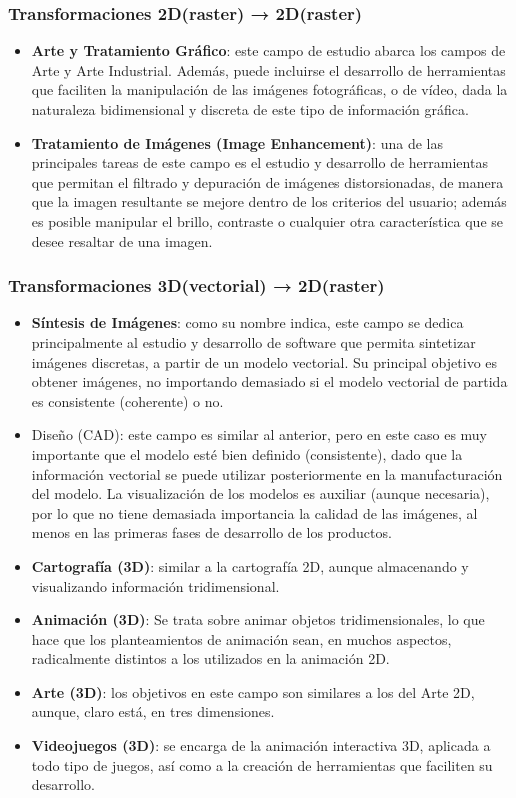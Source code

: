 \subsubsection{Transformaciones 2D(raster) → 2D(raster)}
\begin{itemize}
    \item \textbf{Arte y Tratamiento Gráfico}: este campo de estudio abarca los campos de Arte y Arte Industrial. Además, puede incluirse el desarrollo de herramientas que faciliten la manipulación de las imágenes fotográficas, o de vídeo, dada la naturaleza bidimensional y discreta de este tipo de información gráfica.
    \item \textbf{Tratamiento de Imágenes (Image Enhancement)}: una de las principales tareas de este campo es el estudio y desarrollo de herramientas que permitan el filtrado y depuración de imágenes distorsionadas, de manera que la imagen resultante se mejore dentro de los criterios del usuario; además es posible manipular el brillo, contraste o cualquier otra característica que se desee resaltar de una imagen.
\end{itemize}


\subsubsection{Transformaciones 3D(vectorial) → 2D(raster)}
\begin{itemize}
    \item \textbf{Síntesis de Imágenes}: como su nombre indica, este campo se dedica principalmente al estudio y desarrollo de software que permita sintetizar imágenes discretas, a partir de un modelo vectorial. Su principal objetivo es obtener imágenes, no importando demasiado si el modelo vectorial de partida es consistente (coherente) o no.
    \item Diseño (CAD): este campo es similar al anterior, pero en este caso es muy importante que el modelo esté bien definido (consistente), dado que la información vectorial se puede utilizar posteriormente en la manufacturación del modelo. La visualización de los modelos es auxiliar (aunque necesaria), por lo que no tiene demasiada importancia la calidad de las imágenes, al menos en las primeras fases de desarrollo de los productos.
    \item \textbf{Cartografía (3D)}: similar a la cartografía 2D, aunque almacenando y visualizando información tridimensional.
    \item \textbf{Animación (3D)}: Se trata sobre animar objetos tridimensionales, lo que hace que los planteamientos de animación sean, en muchos aspectos, radicalmente distintos a los utilizados en la animación 2D.
    \item \textbf{Arte (3D)}: los objetivos en este campo son similares a los del Arte 2D, aunque, claro está, en tres dimensiones.
    \item \textbf{Videojuegos (3D)}: se encarga de la animación interactiva 3D, aplicada a todo tipo de juegos, así como a la creación de herramientas que faciliten su desarrollo.
\end{itemize}

